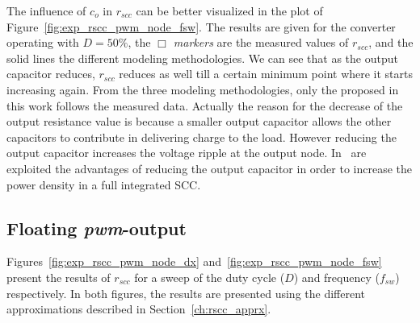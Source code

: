 The influence of $c_o$ in $r_{scc}$ can be better visualized in the plot of  Figure~\ref{fig:exp_rscc_pwm_node_fsw}. The results are given for the converter operating with $D=50\%$, the \emph{$\Box$ markers} are the measured values of $r_{scc}$, and the solid lines the different modeling methodologies. We can see that as the output capacitor reduces, $r_{scc}$ reduces as well till a certain minimum point where it starts increasing again. From the three modeling methodologies, only the  proposed in this work follows the measured data. Actually the reason for the decrease of the output resistance value is because a smaller output capacitor allows the other capacitors to contribute in delivering charge to the load. However reducing the output capacitor increases the voltage ripple at the output node. In~\cite{14Andersen} are exploited the advantages of reducing the output capacitor in order to increase the power density in a full integrated SCC.
\subsection{ Floating \emph{pwm}-output }
Figures~\ref{fig:exp_rscc_pwm_node_dx} and~\ref{fig:exp_rscc_pwm_node_fsw} present the results of $r_{scc}$ for a sweep of the duty cycle ($D$) and frequency ($f_{sw}$) respectively. In both figures, the results are presented using the different approximations described in Section~\ref{ch:rscc_apprx}.

